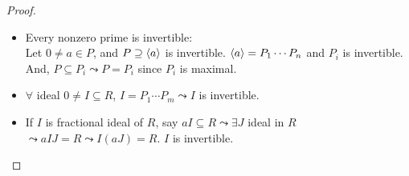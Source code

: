 \begin{theorem}
\begin{proof}
\begin{description}
\begin{itemize}
        \item Every nonzero prime is invertible: \\
          Let $0 \neq a \in P$, and $P \supseteq \langle a\rangle$ is invertible. $\langle a\rangle
            = P_1 \cdots P_n$ and $P_i$ is invertible. And, $P \subseteq P_i 
            \leadsto P = P_i$ since $P_i$ is maximal.
        \item $\forall$ ideal $0 \neq I \subseteq R$, $I = P_1 \cdots P_m \leadsto 
          I$ is invertible.
        \item If $I$ is fractional ideal of $R$, say $aI \subseteq R \leadsto 
          \exists J$ ideal in $R$ $\leadsto aIJ = R \leadsto I(aJ) = R$. $I$ is
            invertible.
        \end{itemize}
  \end{description}
  \end{proof}
\end{theorem}
